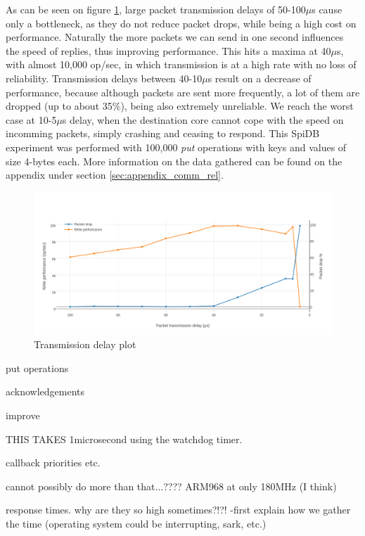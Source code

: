 As can be seen on figure \ref{fig:transmission-delay}, large packet transmission delays of 50-100$\mu$s cause only a bottleneck, as they do not reduce packet drops, while being a high cost on performance. Naturally the more packets we can send in one second influences the speed of replies, thus improving performance. This hits a maxima at 40$\mu$s, with almost 10,000 op/sec, in which transmission is at a high rate with no loss of reliability. Transmission delays between 40-10$\mu$s result on a decrease of performance, because although packets are sent more frequently, a lot of them are dropped (up to about 35\%), being also extremely unreliable. We reach the worst case at 10-5$\mu$s delay, when the destination core cannot cope with the speed on incomming packets, simply crashing and ceasing to respond. This SpiDB experiment was performed with 100,000 \textit{put} operations with keys and values of size 4-bytes each. More information on the data gathered can be found on the appendix under section \ref{sec:appendix_comm_rel}.

\begin{figure}
\begin{center}
	\includegraphics[width=1.4\textwidth, natwidth=1063, natheight=509]{images/transmission_delay.png}
\end{center}
\caption{Transmission delay plot}
\label{fig:transmission-delay}
\end{figure}

put operations

acknowledgements

 improve

THIS TAKES 1microsecond using the watchdog timer.

callback priorities etc.

cannot possibly do more than that...????
ARM968 at only 180MHz (I think)

response times. why are they so high sometimes?!?!
-first explain how we gather the time (operating system could be interrupting, sark, etc.)


